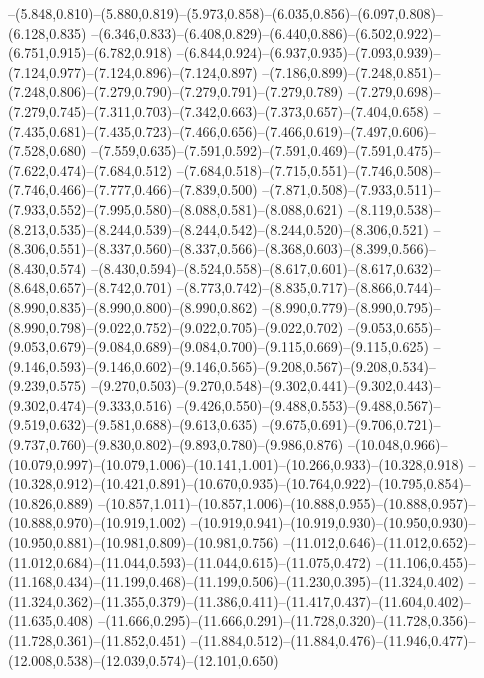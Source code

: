  --(5.848,0.810)--(5.880,0.819)--(5.973,0.858)--(6.035,0.856)--(6.097,0.808)--(6.128,0.835)%
  --(6.346,0.833)--(6.408,0.829)--(6.440,0.886)--(6.502,0.922)--(6.751,0.915)--(6.782,0.918)%
  --(6.844,0.924)--(6.937,0.935)--(7.093,0.939)--(7.124,0.977)--(7.124,0.896)--(7.124,0.897)%
  --(7.186,0.899)--(7.248,0.851)--(7.248,0.806)--(7.279,0.790)--(7.279,0.791)--(7.279,0.789)%
  --(7.279,0.698)--(7.279,0.745)--(7.311,0.703)--(7.342,0.663)--(7.373,0.657)--(7.404,0.658)%
  --(7.435,0.681)--(7.435,0.723)--(7.466,0.656)--(7.466,0.619)--(7.497,0.606)--(7.528,0.680)%
  --(7.559,0.635)--(7.591,0.592)--(7.591,0.469)--(7.591,0.475)--(7.622,0.474)--(7.684,0.512)%
  --(7.684,0.518)--(7.715,0.551)--(7.746,0.508)--(7.746,0.466)--(7.777,0.466)--(7.839,0.500)%
  --(7.871,0.508)--(7.933,0.511)--(7.933,0.552)--(7.995,0.580)--(8.088,0.581)--(8.088,0.621)%
  --(8.119,0.538)--(8.213,0.535)--(8.244,0.539)--(8.244,0.542)--(8.244,0.520)--(8.306,0.521)%
  --(8.306,0.551)--(8.337,0.560)--(8.337,0.566)--(8.368,0.603)--(8.399,0.566)--(8.430,0.574)%
  --(8.430,0.594)--(8.524,0.558)--(8.617,0.601)--(8.617,0.632)--(8.648,0.657)--(8.742,0.701)%
  --(8.773,0.742)--(8.835,0.717)--(8.866,0.744)--(8.990,0.835)--(8.990,0.800)--(8.990,0.862)%
  --(8.990,0.779)--(8.990,0.795)--(8.990,0.798)--(9.022,0.752)--(9.022,0.705)--(9.022,0.702)%
  --(9.053,0.655)--(9.053,0.679)--(9.084,0.689)--(9.084,0.700)--(9.115,0.669)--(9.115,0.625)%
  --(9.146,0.593)--(9.146,0.602)--(9.146,0.565)--(9.208,0.567)--(9.208,0.534)--(9.239,0.575)%
  --(9.270,0.503)--(9.270,0.548)--(9.302,0.441)--(9.302,0.443)--(9.302,0.474)--(9.333,0.516)%
  --(9.426,0.550)--(9.488,0.553)--(9.488,0.567)--(9.519,0.632)--(9.581,0.688)--(9.613,0.635)%
  --(9.675,0.691)--(9.706,0.721)--(9.737,0.760)--(9.830,0.802)--(9.893,0.780)--(9.986,0.876)%
  --(10.048,0.966)--(10.079,0.997)--(10.079,1.006)--(10.141,1.001)--(10.266,0.933)--(10.328,0.918)%
  --(10.328,0.912)--(10.421,0.891)--(10.670,0.935)--(10.764,0.922)--(10.795,0.854)--(10.826,0.889)%
  --(10.857,1.011)--(10.857,1.006)--(10.888,0.955)--(10.888,0.957)--(10.888,0.970)--(10.919,1.002)%
  --(10.919,0.941)--(10.919,0.930)--(10.950,0.930)--(10.950,0.881)--(10.981,0.809)--(10.981,0.756)%
  --(11.012,0.646)--(11.012,0.652)--(11.012,0.684)--(11.044,0.593)--(11.044,0.615)--(11.075,0.472)%
  --(11.106,0.455)--(11.168,0.434)--(11.199,0.468)--(11.199,0.506)--(11.230,0.395)--(11.324,0.402)%
  --(11.324,0.362)--(11.355,0.379)--(11.386,0.411)--(11.417,0.437)--(11.604,0.402)--(11.635,0.408)%
  --(11.666,0.295)--(11.666,0.291)--(11.728,0.320)--(11.728,0.356)--(11.728,0.361)--(11.852,0.451)%
  --(11.884,0.512)--(11.884,0.476)--(11.946,0.477)--(12.008,0.538)--(12.039,0.574)--(12.101,0.650)%
